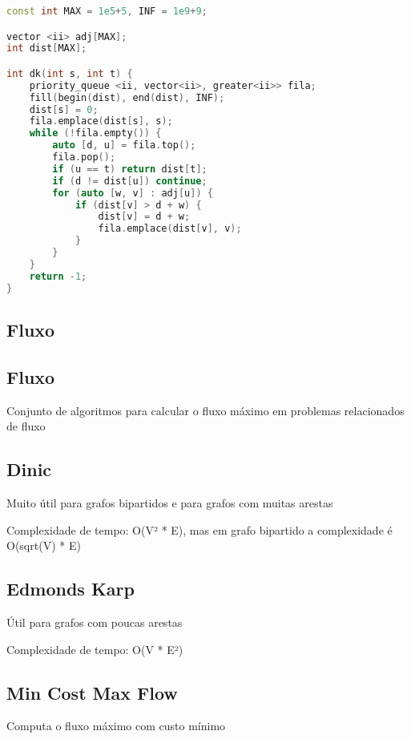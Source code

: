 \documentclass[11pt, a4paper, twoside]{article}
\begin{document}
\begin{multicols}{2}
\begin{lstlisting}[language=C++]
const int MAX = 1e5+5, INF = 1e9+9;

vector <ii> adj[MAX];
int dist[MAX];

int dk(int s, int t) {
    priority_queue <ii, vector<ii>, greater<ii>> fila;
    fill(begin(dist), end(dist), INF);
    dist[s] = 0;
    fila.emplace(dist[s], s);
    while (!fila.empty()) {
        auto [d, u] = fila.top();
        fila.pop();
        if (u == t) return dist[t];
        if (d != dist[u]) continue;
        for (auto [w, v] : adj[u]) {
            if (dist[v] > d + w) {
                dist[v] = d + w;
                fila.emplace(dist[v], v);
            }
        }
    }
    return -1;
}
\end{lstlisting}
\end{multicols}

\subsection{Fluxo}

\subsection{Fluxo}


Conjunto de algoritmos para calcular o fluxo máximo em problemas relacionados de fluxo

\subsection{Dinic}


Muito útil para grafos bipartidos e para grafos com muitas arestas

Complexidade de tempo: O(V² * E), mas em grafo bipartido a complexidade é O(sqrt(V) * E)

\subsection{Edmonds Karp}


Útil para grafos com poucas arestas

Complexidade de tempo: O(V * E²)

\subsection{Min Cost Max Flow}


Computa o fluxo máximo com custo mínimo
\end{document}
